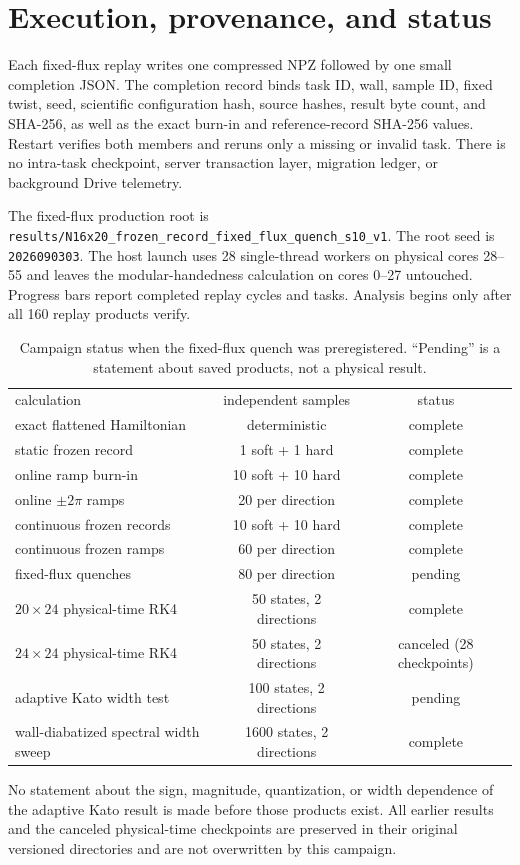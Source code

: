 \documentclass[aps,prb,twocolumn,floatfix,nofootinbib,superscriptaddress]{revtex4-2}
\newcommand{\code}[1]{\texttt{#1}}
\begin{document}
\section{Execution, provenance, and status}

Each fixed-flux replay writes one compressed NPZ followed by one small
completion JSON.  The completion record binds task ID, wall, sample ID, fixed
twist, seed, scientific configuration hash, source hashes, result byte count,
and SHA-256, as well as the exact burn-in and reference-record SHA-256 values.
Restart verifies both members and reruns only a missing or invalid task.  There
is no intra-task checkpoint, server transaction layer, migration ledger, or
background Drive telemetry.

The fixed-flux production root is
\code{results/N16x20\_frozen\_record\_fixed\_flux\_quench\_s10\_v1}.
The root seed is \code{2026090303}.  The host launch uses 28 single-thread workers on physical
cores 28--55 and leaves the modular-handedness calculation on cores 0--27
untouched.  Progress bars report completed replay cycles and tasks.  Analysis
begins only after all 160 replay products verify.

\begin{table}[b]
\caption{Campaign status when the fixed-flux quench was preregistered.
``Pending'' is a statement about saved
products, not a physical result.}
\begin{ruledtabular}
\begin{tabular}{lcc}
calculation & independent samples & status\\
\colrule
exact flattened Hamiltonian & deterministic & complete\\
static frozen record & 1 soft + 1 hard & complete\\
online ramp burn-in & 10 soft + 10 hard & complete\\
online $\pm2\pi$ ramps & 20 per direction & complete\\
continuous frozen records & 10 soft + 10 hard & complete\\
continuous frozen ramps & 60 per direction & complete\\
fixed-flux quenches & 80 per direction & pending\\
$20\times24$ physical-time RK4 & 50 states, 2 directions & complete\\
$24\times24$ physical-time RK4 & 50 states, 2 directions & canceled (28 checkpoints)\\
adaptive Kato width test & 100 states, 2 directions & pending\\
wall-diabatized spectral width sweep & 1600 states, 2 directions & complete\\
\end{tabular}
\end{ruledtabular}
\end{table}

No statement about the sign, magnitude, quantization, or width dependence of
the adaptive Kato result is made before those products exist.  All earlier
results and the canceled physical-time checkpoints are preserved in their
original versioned directories and are not overwritten by this campaign.


\end{document}
